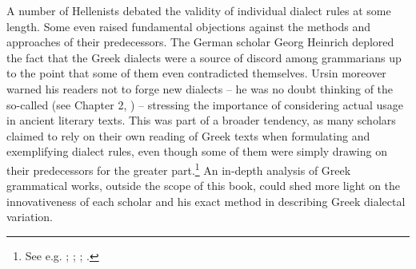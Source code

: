 A number of Hellenists debated the validity of individual dialect rules at some length. Some even raised fundamental objections against the methods and approaches of their predecessors. The German scholar Georg Heinrich \citet[512]{Ursin1691} deplored the fact that the Greek dialects were a source of discord among grammarians up to the point that some of them even contradicted themselves. Ursin moreover warned his readers not to forge new dialects – he was no doubt thinking of the so-called  (see Chapter 2, ) – stressing the importance of considering actual usage in ancient literary texts. This was part of a broader tendency, as many scholars claimed to rely on their own reading of Greek texts when formulating and exemplifying dialect rules, even though some of them were simply drawing on their predecessors for the greater part.\footnote{{See e.g. \citet[†.7\textsc{\textsuperscript{r}}]{Walper1589}; 
\citet[)(.4\textsuperscript{\textsc{r}}]{Portus1603}; \citet[5\textsc{\textsuperscript{[a]}}]{Merigon1621}; \citet[b.4\textsc{\textsuperscript{v}}–b.5\textsc{\textsuperscript{r}}, 432]{Nibbe1725}.}}  An in-depth analysis of Greek grammatical works, outside the scope of this book, could shed more light on the innovativeness of each scholar and his exact method in describing Greek dialectal variation.

